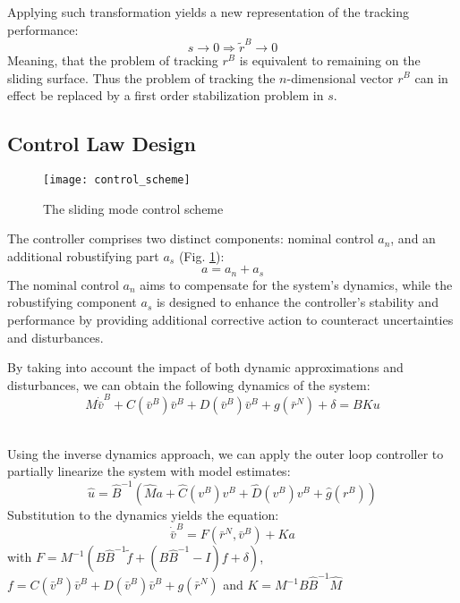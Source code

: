 
    Applying such transformation yields a new representation of the tracking performance:
    $$
        s \rightarrow 0 \Rightarrow \tilde{r}^B \rightarrow 0
    $$
    Meaning, that the problem of tracking $r^B$ is equivalent to remaining on
    the sliding surface. Thus the problem of tracking the $n$-dimensional vector $r^B$
    can in effect be replaced by a first order stabilization problem in $s$.

\subsection{Control Law Design}

\begin{figure}[H]
    \centering\texttt{[image: control\_scheme]}
    \caption{The sliding mode control scheme}
    \label{image:control_scheme}
\end{figure}

    The controller comprises two distinct components: nominal control $a_n$, 
    and an additional robustifying part $a_s$ (Fig. \ref{image:control_scheme}): 
    $$
        a = a_n + a_s
    $$
    The nominal control $a_n$ aims to compensate for the system's dynamics, 
    while the robustifying component $a_s$ is designed to enhance the 
    controller's stability and performance by providing additional corrective 
    action to counteract uncertainties and disturbances.

    By taking into account the impact of both dynamic approximations 
    and disturbances, we can obtain the following dynamics of the 
    system:
    $$
    M \dot{\bar{v}}^B + C(\bar{v}^B) \bar{v}^B+D(\bar{v}^B) \bar{v}^B+g(\bar{r}^N) + \delta = BKu
    $$

    \\
    Using the inverse dynamics approach, we can apply the outer loop 
    controller to partially linearize the system with model estimates:
    $$
    \hat u = \hat{B}^{-1}(\hat{M}a + \hat{C}(v^B)v^B + \hat{D}(v^B)v^B + \hat{g}(r^B))
    $$
    Substitution to the dynamics yields the equation:
    $$
        \dot{\bar{v}}^B = F(\bar{r}^N, \bar{v}^B) + Ka
    $$
    with $F = 
    M^{-1}(B\hat{B}^{-1}\tilde{f} + (B\hat{B}^{-1}-I)f + \delta)$, 
    $f = 
    C(\bar{v}^B) \bar{v}^B + D(\bar{v}^B) \bar{v}^B + g(\bar{r}^N)$
    and $K = M^{-1}B\hat{B}^{-1}\hat{M}$

